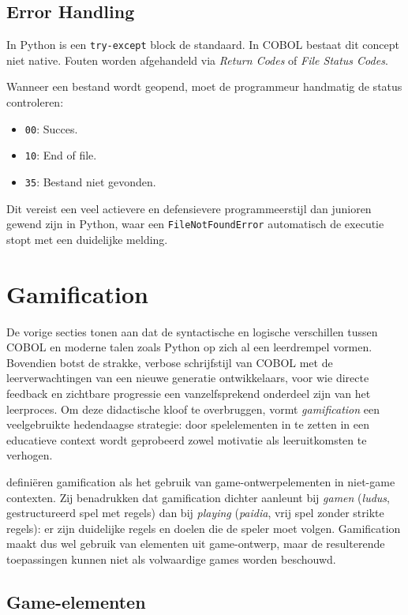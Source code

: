 \subsection{Error Handling}
In Python is een \texttt{try-except} block de standaard. In COBOL bestaat dit concept niet native. Fouten worden afgehandeld via \textit{Return Codes} of \textit{File Status Codes}. 

Wanneer een bestand wordt geopend, moet de programmeur handmatig de status controleren:
\begin{itemize}
    \item \texttt{00}: Succes.
    \item \texttt{10}: End of file.
    \item \texttt{35}: Bestand niet gevonden.
\end{itemize}
Dit vereist een veel actievere en defensievere programmeerstijl dan junioren gewend zijn in Python, waar een \texttt{FileNotFoundError} automatisch de executie stopt met een duidelijke melding.

\section{Gamification}
\label{sec:gamification}

De vorige secties tonen aan dat de syntactische en logische verschillen tussen COBOL en moderne talen zoals Python op zich al een leerdrempel vormen. 
Bovendien botst de strakke, verbose schrijfstijl van COBOL met de leerverwachtingen van een nieuwe generatie ontwikkelaars, voor wie directe feedback en zichtbare progressie een vanzelfsprekend onderdeel zijn van het leerproces. 
Om deze didactische kloof te overbruggen, vormt \textit{gamification} een veelgebruikte hedendaagse strategie: door spelelementen in te zetten in een educatieve context wordt geprobeerd zowel motivatie als leeruitkomsten te verhogen.

\textcite{Deterding2011} definiëren gamification als het gebruik van game-\allowbreak ontwerpelementen in niet-\allowbreak game contexten. 
Zij benadrukken dat gamification dichter aanleunt bij \textit{gamen} (\textit{ludus}, gestructureerd spel met regels) dan bij \textit{playing} (\textit{paidia}, vrij spel zonder strikte regels): er zijn duidelijke regels en doelen die de speler moet volgen. 
Gamification maakt dus wel gebruik van elementen uit game-ontwerp, maar de resulterende toepassingen kunnen niet als volwaardige games worden beschouwd.

\subsection{Game-elementen}

